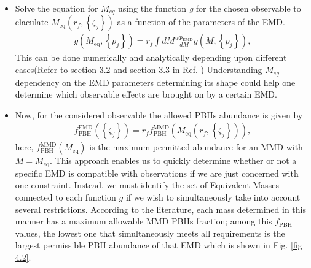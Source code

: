 \begin{itemize}
    \item Solve the equation for $M_{eq}$ using the function \emph{g} for the chosen observable to claculate $M_{\mathrm{eq}}\left(r_{f},\left\{\zeta_{j}\right\}\right)$ as a function of the parameters of the EMD.
    \begin{align}
        g\left(M_{\mathrm{eq}},\left\{p_{j}\right\}\right)=r_{f} \int d M \frac{d \Phi_{\mathrm{EMD}}}{d M} g\left(M,\left\{p_{j}\right\}\right), \label{4.18}
    \end{align}
    This can be done numerically and analytically depending upon different cases(Refer to section  3.2 and  section  3.3 in Ref. \cite{Bellomo:2017zsr})
    Understanding $M_{eq}$ dependency on the EMD parameters determining its shape could help one determine which observable effects are brought on by a certain EMD.

\end{itemize}

\begin{itemize}
    \item Now, for the considered observable the allowed PBHs abundance is given by
    \begin{align}
        f_{\mathrm{PBH}}^{\mathrm{EMD}}\left(\left\{\zeta_{j}\right\}\right)=r_{f} f_{\mathrm{PBH}}^{\mathrm{MMD}}\left(M_{\mathrm{eq}}\left(r_{f},\left\{\zeta_{j}\right\}\right)\right), \label{4.19}
    \end{align}
    here, $f_{\mathrm{PBH}}^{\mathrm{MMD}}\left(M_{\mathrm{eq}}\right)$ is the maximum permitted abundance for an MMD with $M=M_{\mathrm{eq}}$. This approach enables us to quickly determine whether or not a specific EMD is compatible with observations if we are just concerned with one constraint. Instead, we must identify the set of Equivalent Masses connected to each function $g$ if we wish to simultaneously take into account several restrictions. According to the literature, each mass determined in this manner has a maximum allowable MMD PBHs fraction; among this $ f_{\mathrm{PBH}}$ values, the lowest one that simultaneously meets all requirements is the largest permissible PBH abundance of that EMD which is shown in Fig. \ref{fig 4.2}. 
\end{itemize}

